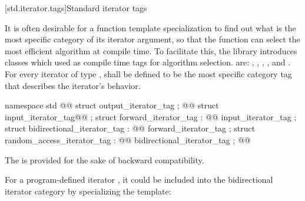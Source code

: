 [std.iterator.tags]{Standard iterator tags}

\pnum
{}%
%
%
%
%
It is often desirable for a
function template specialization
to find out what is the most specific category of its iterator
argument, so that the function can select the most efficient algorithm at compile time.
To facilitate this, the
library introduces
classes which  used as compile time tags for algorithm selection.
 are:
,
,
,
,
and
.
For every iterator of type
,
shall be defined to be the most specific category tag that describes the
iterator's behavior.

\begin{codeblock}
namespace std { @@
  struct output_iterator_tag { };
  @@
  struct input_iterator_tag@@ { };
  struct forward_iterator_tag : @@ input_iterator_tag { };
  struct bidirectional_iterator_tag : @@ forward_iterator_tag { };
  struct random_access_iterator_tag : @@ bidirectional_iterator_tag { };
}@\added{\}\}\newtxt{\}}}@
\end{codeblock}

\begin{addedblock}
\pnum
\enternote
The  is provided for the sake of backward compatibility.
\exitnote
\end{addedblock}

\pnum
{}%
%
%
%
%
%
\enterexample
For a program-defined iterator
,
it could be included
into the bidirectional iterator category by specializing the
\added{, }
 template:

